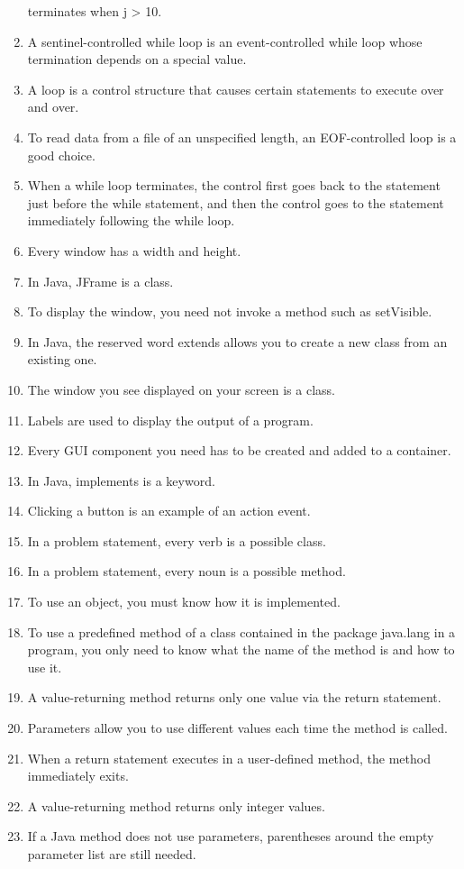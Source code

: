 \documentclass[12pt,a4paper,final,twoside,onecolumn,titlepage]{book}
\begin{document}
\begin{enumerate}
terminates when j > 10.
\item A sentinel-controlled while loop is an event-controlled while loop whose termination depends on a special value.
\item A loop is a control structure that causes certain statements to execute over and over.
\item To read data from a file of an unspecified length, an EOF-controlled loop is a good choice.
\item When a while loop terminates, the control first goes back to the statement just before the while statement, and then the control goes to the statement immediately following the while loop.
\item Every window has a width and height.
\item In Java, JFrame is a class.
\item To display the window, you need not invoke a method such as setVisible.
\item In Java, the reserved word extends allows you to create a new class from an existing one.
\item The window you see displayed on your screen is a class.
\item Labels are used to display the output of a program.
\item Every GUI component you need has to be created and added to a container.
\item In Java, implements is a keyword.
\item Clicking a button is an example of an action event.
\item In a problem statement, every verb is a possible class.
\item In a problem statement, every noun is a possible method.
\item To use an object, you must know how it is implemented.
\item To use a predefined method of a class contained in the package java.lang in a program, you only need to know what the name of the method is and how to use it.
\item A value-returning method returns only one value via the return statement.
\item Parameters allow you to use different values each time the method is called.
\item When a return statement executes in a user-defined method, the method immediately exits.
\item A value-returning method returns only integer values.
\item If a Java method does not use parameters, parentheses around the empty parameter list are still needed.

\end{enumerate}
\end{document}
